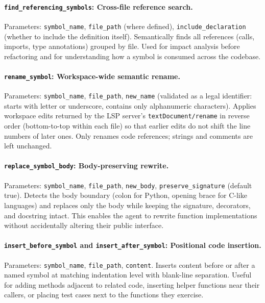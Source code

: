 \paragraph{\texttt{find\_referencing\_symbols}: Cross-file reference search.} Parameters: \texttt{symbol\_name}, \texttt{file\_path} (where defined), \texttt{include\_declaration} (whether to include the definition itself). Semantically finds all references (calls, imports, type annotations) grouped by file. Used for impact analysis before refactoring and for understanding how a symbol is consumed across the codebase.

\paragraph{\texttt{rename\_symbol}: Workspace-wide semantic rename.} Parameters: \texttt{symbol\_name}, \texttt{file\_path}, \texttt{new\_name} (validated as a legal identifier: starts with letter or underscore, contains only alphanumeric characters). Applies workspace edits returned by the LSP server's \texttt{textDocument/rename} in reverse order (bottom-to-top within each file) so that earlier edits do not shift the line numbers of later ones. Only renames code references; strings and comments are left unchanged.

\paragraph{\texttt{replace\_symbol\_body}: Body-preserving rewrite.} Parameters: \texttt{symbol\_name}, \texttt{file\_path}, \texttt{new\_body}, \texttt{preserve\_signature} (default true). Detects the body boundary (colon for Python, opening brace for C-like languages) and replaces only the body while keeping the signature, decorators, and docstring intact. This enables the agent to rewrite function implementations without accidentally altering their public interface.

\paragraph{\texttt{insert\_before\_symbol} and \texttt{insert\_after\_symbol}: Positional code insertion.} Parameters: \texttt{symbol\_name}, \texttt{file\_path}, \texttt{content}. Inserts content before or after a named symbol at matching indentation level with blank-line separation. Useful for adding methods adjacent to related code, inserting helper functions near their callers, or placing test cases next to the functions they exercise.

